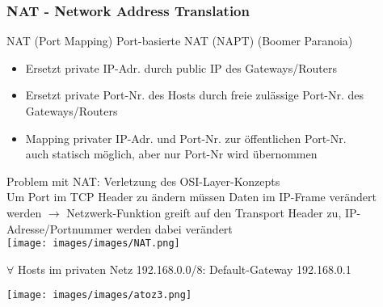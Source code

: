 \subsubsection{NAT - Network Address Translation}

\begin{definition}{NAT (Port Mapping)} Port-basierte NAT (NAPT) {\tiny (Boomer Paranoia)}    
    \begin{itemize}
        \item Ersetzt private IP-Adr. durch public IP des Gateways/Routers
        \item Ersetzt private Port-Nr. des Hosts durch freie zulässige Port-Nr. des Gateways/Routers
        \item Mapping privater IP-Adr. und Port-Nr. zur öffentlichen Port-Nr.
                \\auch statisch möglich, aber nur Port-Nr wird übernommen
    \end{itemize}
    Problem mit NAT: Verletzung des OSI-Layer-Konzepts\\
    Um Port im TCP Header zu ändern müssen Daten im IP-Frame verändert werden 
    $\rightarrow$ Netzwerk-Funktion greift auf den Transport Header zu,
    IP-Adresse/Portnummer werden dabei verändert\\
        \texttt{[image: images/images/NAT.png]}
\end{definition}
\begin{remark}
    $\forall$ Hosts im privaten Netz 192.168.0.0/8: Default-Gateway 192.168.0.1
\end{remark}

\texttt{[image: images/images/atoz3.png]}




